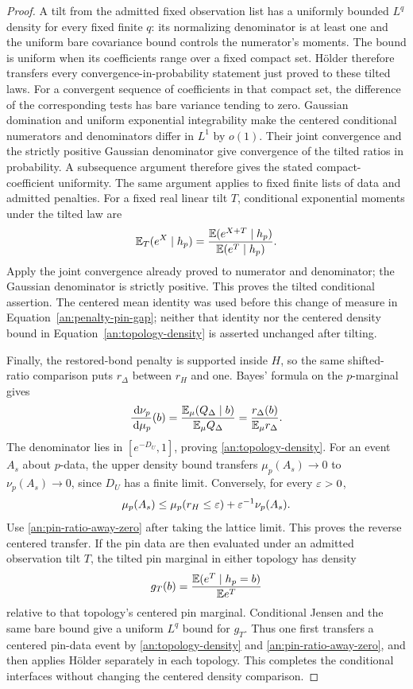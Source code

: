 \begin{proof}
A tilt from the admitted fixed observation list has a uniformly
bounded $L^q$ density for every fixed finite $q$: its normalizing
denominator is at least one and the uniform bare covariance bound
controls the numerator's moments.  The bound is uniform when its
coefficients range over a fixed compact set.  H\"older therefore
transfers every convergence-in-probability statement just proved
to these tilted laws.  For a convergent sequence of coefficients
in that compact set, the difference of the corresponding tests has
bare variance tending to zero.  Gaussian domination and uniform
exponential integrability make the centered conditional numerators
and denominators differ in $L^1$ by $o(1)$.  Their joint convergence
and the strictly positive Gaussian denominator give convergence of
the tilted ratios in probability.  A subsequence argument therefore
gives the stated compact-coefficient uniformity.
The same argument applies to fixed finite lists of data and
admitted penalties.
For a fixed real linear tilt $T$, conditional exponential moments
under the tilted law are
\[
 \mathbb E_T(e^X\mid h_p)=
 \frac{\mathbb E(e^{X+T}\mid h_p)}{\mathbb E(e^T\mid h_p)}.
\]
Apply the joint convergence already proved to numerator and denominator;
the Gaussian denominator is strictly positive.  This proves the tilted
conditional assertion.  The centered mean identity was used before
this change of measure in Equation~\eqref{an:penalty-pin-gap}; neither
that identity nor the centered density bound in
Equation~\eqref{an:topology-density} is asserted unchanged after tilting.

Finally, the restored-bond penalty
is supported inside $H$, so the
same shifted-ratio comparison puts
$r_\Delta$ between $r_H$ and one.
Bayes' formula on the $p$-marginal
gives
\[
 \frac{\,\mathrm d\nu_p}{\,\mathrm d\mu_p}(b)
 =\frac{\mathbb E_\mu(Q_\Delta\mid b)}{\mathbb E_\mu Q_\Delta}
 =\frac{r_\Delta(b)}{\mathbb E_\mu r_\Delta}.
\]
The denominator lies in
$[e^{-D_U},1]$, proving
\eqref{an:topology-density}.
For an event $A_s$ about $p$-data,
the upper density bound transfers
$\mu_p(A_s)\to0$ to
$\nu_p(A_s)\to0$, since $D_U$
has a finite limit.  Conversely,
for every $\varepsilon>0$,
\[
 \mu_p(A_s)\le\mu_p(r_H\le\varepsilon)
                       +\varepsilon^{-1}\nu_p(A_s).
\]
Use \eqref{an:pin-ratio-away-zero}
after taking the lattice limit.
This proves the reverse centered transfer.  If the pin data are
then evaluated under an admitted observation tilt $T$, the tilted
pin marginal in either topology has density
\[
 g_T(b)=\frac{\mathbb E(e^T\mid h_p=b)}{\mathbb E e^T}
\]
relative to that topology's centered pin marginal.  Conditional
Jensen and the same bare bound give a uniform $L^q$ bound for
$g_T$.  Thus one first transfers a centered pin-data event by
\eqref{an:topology-density} and
\eqref{an:pin-ratio-away-zero}, and then applies H\"older
separately in each topology.  This completes the conditional
interfaces without changing the centered density comparison.
\end{proof}
